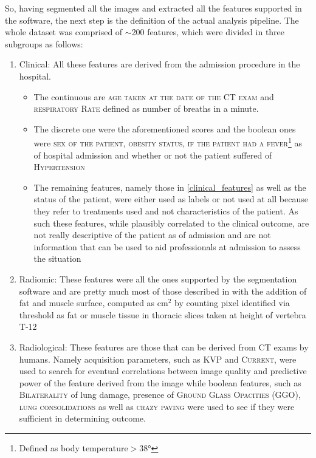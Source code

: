 So, having segmented all the images and extracted all the features supported in the software, the next step is the definition of the actual analysis pipeline. The whole dataset was comprised of $\sim$200 features, which were divided in three subgroups as follows:

\begin{enumerate}
\item Clinical: All these features are derived from the admission procedure in the hospital.
	\begin{itemize}
        \item The continuous are {\scshape age taken at the date of the CT exam} and {\scshape respiratory Rate} defined as number of breaths in a minute.
		\item The discrete one were the aforementioned scores and the boolean ones were {\scshape sex of the patient, obesity status, if the patient had a fever}\footnote{Defined as body temperature$>$38°} as of hospital admission and whether or not the patient suffered of {\scshape Hypertension}
		\item The remaining features, namely those in \ref{clinical_features} as well as the \death status of the patient, were either used as labels or not used at all because they refer to treatments used and not characteristics of the patient. As such these features, while plausibly correlated to the clinical outcome, are not really descriptive of the patient as of admission and are not information that can be used to aid professionals at admission to assess the situation
	\end{itemize}
\item Radiomic: These features were all the ones supported by the segmentation software and are pretty much most of those described in \cite{IBSI} with the addition of fat and muscle surface, computed as cm$^2$ by counting pixel identified via threshold as fat or muscle tissue in thoracic slices taken at height of vertebra T-12
\item Radiological: These features are those that can be derived from CT exams by humans. Namely acquisition parameters, such as {\scshape KVP} and {\scshape Current}, were used to search for eventual correlations between image quality and predictive power of the feature derived from the image while boolean features, such as {\scshape Bilaterality} of lung damage, presence of {\scshape Ground Glass Opacities (GGO)}, {\scshape lung consolidations} as well as {\scshape crazy paving} were used to see if they were sufficient in determining outcome.
\end{enumerate}

